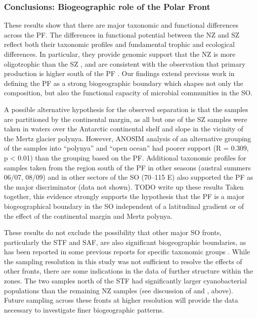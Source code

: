 \subsubsection{Conclusions: Biogeographic role of the Polar Front}

These results show that there are major taxonomic and functional differences across the \ac{PF}.
The differences in functional potential between the \ac{NZ} and \ac{SZ} reflect both their taxonomic profiles and fundamental trophic and ecological differences.
In particular, they provide genomic support that the \ac{NZ} is more oligotrophic than the \ac{SZ} \cite{Pollard:2002vr,Giovannoni:2005ib,Alonso:2006dj,Lauro:2009gx}, and are consistent with the observation that primary production is higher south of the \ac{PF} \cite{Strutton:2000ta,Williams:2010jy}.
Our findings extend previous work in defining the \ac{PF} as a strong biogeographic boundary which shapes not only the composition, but also the functional capacity of microbial communities in the \ac{SO}.

A possible alternative hypothesis for the observed separation is that the samples are partitioned by the continental margin, as all but one of the \ac{SZ} samples were taken in waters over the Antarctic continental shelf and slope in the vicinity of the Mertz glacier polynya.
However, \ac{ANOSIM} analysis of an alternative grouping of the samples into ``polynya'' and ``open ocean'' had poorer support (R = 0.309, p < 0.01) than the grouping based on the \ac{PF}.
Additional taxonomic profiles for samples taken from the region south of the \ac{PF} in other seasons (austral summers 06/07, 08/09) and in other sectors of the \ac{SO} (70--115\textdegree{} E) also supported the \ac{PF} as the major discriminator (data not shown).
TODO write up these results
Taken together, this evidence strongly supports the hypothesis that the \ac{PF} is a major biogeographical boundary in the \ac{SO} independent of a latitudinal gradient or of the effect of the continental margin and Mertz polynya.

These results do not exclude the possibility that other major \ac{SO} fronts, particularly the \ac{STF} and \ac{SAF}, are also significant biogeographic boundaries, as has been reported in some previous reports for specific taxonomic groups \citep[e.g.][]{Abell:2005ji}.
While the sampling resolution in this study was not sufficient to resolve the effects of other fronts, there are some indications in the data of further structure within the zones.
The two samples north of the \ac{STF} had significantly larger cyanobacterial populations than the remaining \ac{NZ} samples (see discussion of  and , above).
Future sampling across these fronts at higher resolution will provide the data necessary to investigate finer biogeographic patterns.

